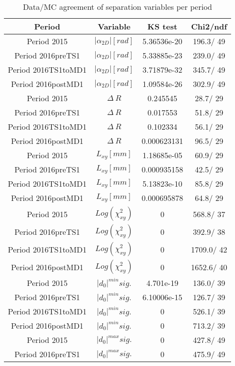 \documentclass{article}
\begin{document}
\begin{longtable}{c|c|c|c}
\caption{\label{tab:sepVarsandSepPeriods}Data/MC agreement of separation variables per period}\\
Period & Variable & KS test & Chi2/ndf \\
\hline
 Period 2015 & $|\alpha_{2D}| [rad]$ & 5.36536e-20 & 196.3/ 49\\
\hline
 Period 2016preTS1 & $|\alpha_{2D}| [rad]$ & 5.33885e-23 & 239.0/ 49\\
\hline
 Period 2016TS1toMD1 & $|\alpha_{2D}| [rad]$ & 3.71879e-32 & 345.7/ 49\\
\hline
 Period 2016postMD1 & $|\alpha_{2D}| [rad]$ & 1.09584e-26 & 302.9/ 49\\
\hline
 Period 2015 & $\Delta~R$ & 0.245545 &  28.7/ 29\\
\hline
 Period 2016preTS1 & $\Delta~R$ & 0.017553 &  51.8/ 29\\
\hline
 Period 2016TS1toMD1 & $\Delta~R$ & 0.102334 &  56.1/ 29\\
\hline
 Period 2016postMD1 & $\Delta~R$ & 0.000623131 &  96.5/ 29\\
\hline
 Period 2015 & $L_{xy} [mm]$ & 1.18685e-05 &  60.9/ 29\\
\hline
 Period 2016preTS1 & $L_{xy} [mm]$ & 0.000935158 &  42.5/ 29\\
\hline
 Period 2016TS1toMD1 & $L_{xy} [mm]$ & 5.13823e-10 &  85.8/ 29\\
\hline
 Period 2016postMD1 & $L_{xy} [mm]$ & 0.000695878 &  64.8/ 29\\
\hline
 Period 2015 & $Log(\chi^{2}_{xy})$ & 0 & 568.8/ 37\\
\hline
 Period 2016preTS1 & $Log(\chi^{2}_{xy})$ & 0 & 392.9/ 38\\
\hline
 Period 2016TS1toMD1 & $Log(\chi^{2}_{xy})$ & 0 & 1709.0/ 42\\
\hline
 Period 2016postMD1 & $Log(\chi^{2}_{xy})$ & 0 & 1652.6/ 40\\
\hline
 Period 2015 & $|d_{0}|^{min} sig.$ & 4.701e-19 & 136.0/ 39\\
\hline
 Period 2016preTS1 & $|d_{0}|^{min} sig.$ & 6.10006e-15 & 126.7/ 39\\
\hline
 Period 2016TS1toMD1 & $|d_{0}|^{min} sig.$ & 0 & 526.1/ 39\\
\hline
 Period 2016postMD1 & $|d_{0}|^{min} sig.$ & 0 & 713.2/ 39\\
\hline
 Period 2015 & $|d_{0}|^{max} sig.$ & 0 & 427.8/ 49\\
\hline
 Period 2016preTS1 & $|d_{0}|^{max} sig.$ & 0 & 475.9/ 49\\

\end{longtable}
\end{document}
